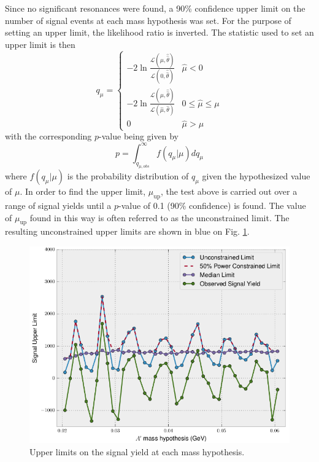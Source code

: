 Since no significant resonances were found, a 90\% confidence upper limit on the number
of signal events at each mass hypothesis was set.  For the purpose of setting
an upper limit, the likelihood ratio is inverted.  The statistic used
to set an upper limit is then
\begin{equation}
    q_{\mu} = \begin{cases}
        -2 \ln \frac{\mathcal{L}(\mu, \hat{\hat{\theta}})}{\mathcal{L}(0, \hat{\hat{\theta}})} 
            & \hat{\mu} < 0 \\
        -2 \ln \frac{\mathcal{L}(\mu, \hat{\hat{\theta}})}{\mathcal{L}(\hat{\mu}, \hat{\theta})} 
            & 0 \leq \hat{\mu} \leq \mu \\
             0  & \hat{\mu} > \mu
        \end{cases}
\end{equation}
with the corresponding $p$-value being given by
\begin{equation}
    p = \int_{q_{\mu,obs}}^{\infty} f(q_{\mu} | \mu) dq_{\mu}
\end{equation}
where $f(q_{\mu}|\mu)$ is the probability distribution of $q_{\mu}$ given the
hypothesized value of $\mu$. 
In order to find the upper limit, $\mu_{\text{up}}$, the test above is carried out over a range of
signal yields until a $p$-value of 0.1 (90\% confidence) is found. The value of
$\mu_{\text{up}}$ found in this way
is often referred to as the unconstrained limit. The resulting 
unconstrained upper limits are shown in blue on Fig. \ref{fig:upper_limit}. 
\begin{figure}[t]
    \centering
    \includegraphics[width=\textwidth]{images/upper_limits.png}
    \caption{Upper limits on the signal yield at each mass hypothesis.}
    \label{fig:upper_limit}
\end{figure}

